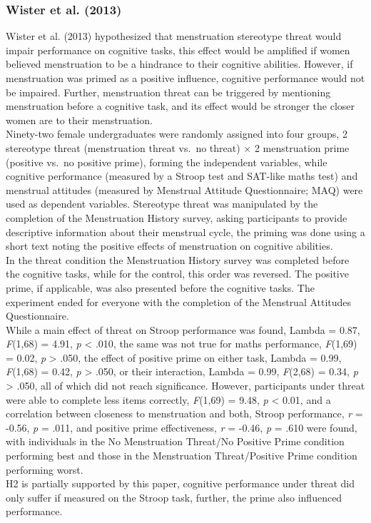 \documentclass[
  stu,floatsintext]{apa7}
\begin{document}
\subsubsection{Wister et al. (2013)}\label{wistermentioningmenstruationstereotype2013}

Wister et al. (2013) hypothesized that menstruation stereotype threat would impair performance on cognitive tasks, this effect would be amplified if women believed menstruation to be a hindrance to their cognitive abilities.
However, if menstruation was primed as a positive influence, cognitive performance would not be impaired.
Further, menstruation threat can be triggered by mentioning menstruation before a cognitive task, and its effect would be stronger the closer women are to their menstruation.\\
Ninety-two female undergraduates were randomly assigned into four groups, 2 stereotype threat (menstruation threat vs.~no threat) \(\times\) 2 menstruation prime (positive vs.~no positive prime), forming the independent variables, while cognitive performance (measured by a Stroop test and SAT-like maths test) and menstrual attitudes (measured by Menstrual Attitude Questionnaire; MAQ) were used as dependent variables.
Stereotype threat was manipulated by the completion of the Menstruation History survey, asking participants to provide descriptive information about their menstrual cycle, the priming was done using a short text noting the positive effects of menstruation on cognitive abilities.\\
In the threat condition the Menstruation History survey was completed before the cognitive tasks, while for the control, this order was reversed.
The positive prime, if applicable, was also presented before the cognitive tasks.
The experiment ended for everyone with the completion of the Menstrual Attitudes Questionnaire.\\
While a main effect of threat on Stroop performance was found, Lambda = 0.87, \emph{F}(1,68) = 4.91, \emph{p} \textless{} .010, the same was not true for maths performance, \emph{F}(1,69) = 0.02, \emph{p} \textgreater{} .050, the effect of positive prime on either task, Lambda = 0.99, \emph{F}(1,68) = 0.42, \emph{p} \textgreater{} .050, or their interaction, Lambda = 0.99, \emph{F}(2,68) = 0.34, \emph{p} \textgreater{} .050, all of which did not reach significance.
However, participants under threat were able to complete less items correctly, \emph{F}(1,69) = 9.48, \emph{p} \textless{} 0.01, and a correlation between closeness to menstruation and both, Stroop performance, \emph{r} = -0.56, \emph{p} = .011, and positive prime effectiveness, \emph{r} = -0.46, \emph{p} = .610 were found, with individuals in the No Menstruation Threat/No Positive Prime condition performing best and those in the Menstruation Threat/Positive Prime condition performing worst.\\
H2 is partially supported by this paper, cognitive performance under threat did only suffer if measured on the Stroop task, further, the prime also influenced performance.
\end{document}
